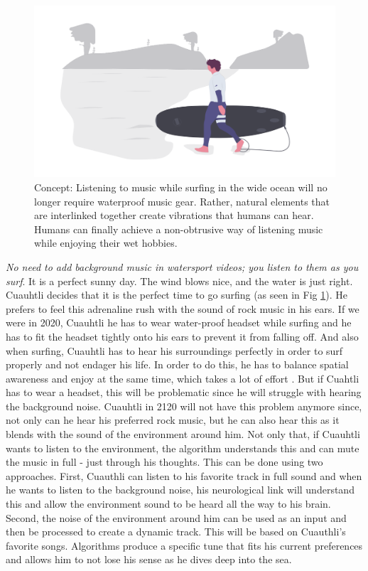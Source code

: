 \documentclass[sigchi]{acmart}
\begin{document}
\begin{figure}[h]
  \centering
  \includegraphics[width=\linewidth]{acmart-master-2/samples/surfbnw.png}
  \caption{Concept: Listening to music while surfing in the wide ocean will no longer require waterproof music gear. Rather, natural elements that are interlinked together create vibrations that humans can hear. Humans can finally achieve a non-obtrusive way of listening music while enjoying their wet hobbies. }
  \label{fig: surf}
\end{figure}
\textit{No need to add background music in watersport videos; you listen to them as you surf}. It is a perfect sunny day. The wind blows nice, and the water is just right. Cuauhtli decides that it is the perfect time to go surfing (as seen in Fig \ref{fig: surf}). He prefers to feel this adrenaline rush with the sound of rock music in his ears. If we were in 2020, Cuauhtli he has to wear water-proof headset while surfing and he has to fit the headset tightly onto his ears to prevent it from falling off. And also when surfing, Cuauhtli has to hear his surroundings perfectly in order to surf properly and not endager his life. In order to do this, he has to balance spatial awareness and enjoy at the same time, which takes a lot of effort \cite{fuchs2018dancing}. But if Cuahtli has to wear a headset, this will be problematic since he will struggle with hearing the background noise. Cuauhtli in 2120 will not have this problem anymore since, not only can he hear his preferred rock music, but he can also hear this as it blends with the sound of the environment around him.  Not only that, if Cuauhtli wants to listen to the environment, the algorithm understands this and can mute the music in full - just through his thoughts. This can be done using two approaches. First, Cuauthli can listen to his favorite track in full sound and when he wants to listen to the background noise, his neurological link will understand this and allow the environment sound to be heard all the way to his brain. Second, the noise of the environment around him can be used as an input and then be processed to create a dynamic track. This will be based on Cuauthli's favorite songs. Algorithms produce a specific tune that fits his current preferences and allows him to not lose his sense as he dives deep into the sea. 
\end{document}
